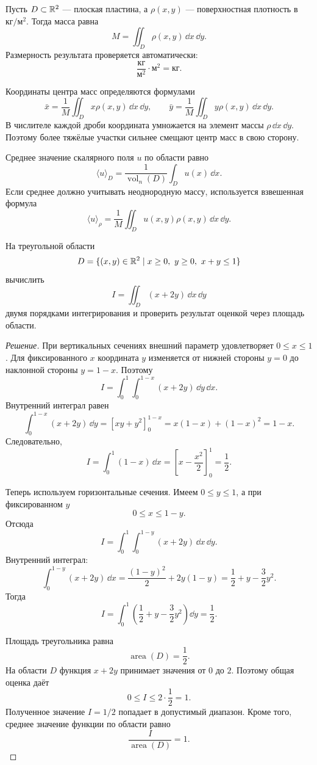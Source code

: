Пусть $D\subset\mathbb{R}^2$ --- плоская пластина, а $\rho(x,y)$ --- поверхностная плотность в $\text{кг}/\text{м}^2$. Тогда масса равна
\begin{equation}
M
=
\iint_D\rho(x,y)\,\dd x\,\dd y.
\label{eq:plate-mass}
\end{equation}
Размерность результата проверяется автоматически:
\[
\frac{\text{кг}}{\text{м}^2}\cdot\text{м}^2
=\text{кг}.
\]

Координаты центра масс определяются формулами
\begin{equation}
\bar x
=
\frac{1}{M}\iint_Dx\rho(x,y)\,\dd x\,\dd y,
\qquad
\bar y
=
\frac{1}{M}\iint_Dy\rho(x,y)\,\dd x\,\dd y.
\label{eq:plate-center-mass}
\end{equation}
В числителе каждой дроби координата умножается на элемент массы $\rho\,\dd x\,\dd y$. Поэтому более тяжёлые участки сильнее смещают центр масс в свою сторону.

Среднее значение скалярного поля $u$ по области равно
\begin{equation}
\langle u\rangle_D
=
\frac{1}{\operatorname{vol}_n(D)}
\int_Du(x)\,\dd x.
\label{eq:spatial-average}
\end{equation}
Если среднее должно учитывать неоднородную массу, используется взвешенная формула
\begin{equation}
\langle u\rangle_{\rho}
=
\frac{1}{M}
\iint_Du(x,y)\rho(x,y)\,\dd x\,\dd y.
\label{eq:mass-weighted-average}
\end{equation}

\begin{problem}
На треугольной области
\[
D
=
\{(x,y)\in\mathbb{R}^2
\mid
x\geq0,
\ y\geq0,
\ x+y\leq1\}
\]
вычислить
\[
I=\iint_D(x+2y)\,\dd x\,\dd y
\]
двумя порядками интегрирования и проверить результат оценкой через площадь области.
\end{problem}

\begin{proof}[Решение]
При вертикальных сечениях внешний параметр удовлетворяет $0\leq x\leq1$. Для фиксированного $x$ координата $y$ изменяется от нижней стороны $y=0$ до наклонной стороны $y=1-x$. Поэтому
\[
I
=
\int_0^1\int_0^{1-x}(x+2y)\,\dd y\,\dd x.
\]
Внутренний интеграл равен
\[
\int_0^{1-x}(x+2y)\,\dd y
=
\left[xy+y^2\right]_{0}^{1-x}
=
x(1-x)+(1-x)^2
=1-x.
\]
Следовательно,
\[
I
=
\int_0^1(1-x)\,\dd x
=
\left[x-\frac{x^2}{2}\right]_0^1
=\frac12.
\]

Теперь используем горизонтальные сечения. Имеем $0\leq y\leq1$, а при фиксированном $y$
\[
0\leq x\leq1-y.
\]
Отсюда
\[
I
=
\int_0^1\int_0^{1-y}(x+2y)\,\dd x\,\dd y.
\]
Внутренний интеграл:
\[
\int_0^{1-y}(x+2y)\,\dd x
=
\frac{(1-y)^2}{2}+2y(1-y)
=
\frac12+y-\frac32y^2.
\]
Тогда
\[
I
=
\int_0^1
\left(
\frac12+y-\frac32y^2
\right)\dd y
=
\frac12.
\]

Площадь треугольника равна
\[
\operatorname{area}(D)=\frac12.
\]
На области $D$ функция $x+2y$ принимает значения от $0$ до $2$. Поэтому общая оценка даёт
\[
0
\leq I
\leq
2\cdot\frac12=1.
\]
Полученное значение $I=1/2$ попадает в допустимый диапазон. Кроме того, среднее значение функции по области равно
\[
\frac{I}{\operatorname{area}(D)}=1.
\]
\end{proof}

